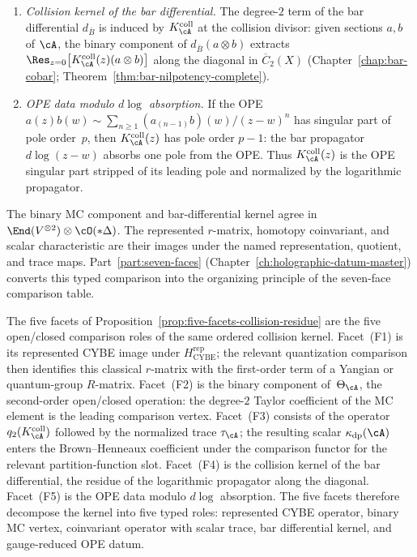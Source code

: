 \begin{proposition}
\begin{enumerate}[label=\textup{(F\arabic*)}]
\item \emph{Collision kernel of the bar differential.}
 The degree-$2$ term of the bar differential $d_{\bar{B}}$ is induced
 by $K_\cA^{\mathrm{coll}}$ at the collision divisor: given sections
 $a,b$ of $\cA$,
 the binary component of $d_{\bar{B}}(a \otimes b)$ extracts
 $\Res_{z=0}\bigl[K_\cA^{\mathrm{coll}}(z)(a \otimes b)\bigr]$ along the
 diagonal in $\overline{C}_2(X)$
 \textup{(}Chapter~\textup{\ref{chap:bar-cobar}};
 Theorem~\textup{\ref{thm:bar-nilpotency-complete}}\textup{)}.

\item \emph{OPE data modulo $d\log$ absorption.}
 If the OPE $a(z) b(w) \sim \sum_{n \geq 1}
 (a_{(n-1)} b)(w)/(z-w)^{n}$ has singular part of pole order~$p$,
 then $K_\cA^{\mathrm{coll}}(z)$ has pole order $p - 1$: the bar propagator
 $d\log(z - w)$ absorbs one pole from the OPE. Thus
 $K_\cA^{\mathrm{coll}}(z)$ is
 the OPE singular part stripped of its leading pole and normalized
 by the logarithmic propagator.
\end{enumerate}
The binary MC component and bar-differential kernel agree in
$\End(V^{\otimes 2})\otimes\cO(*\Delta)$.  The represented
$r$-matrix, homotopy coinvariant, and scalar characteristic are their
images under the named representation, quotient, and trace maps.
Part~\ref{part:seven-faces}
(Chapter~\textup{\ref{ch:holographic-datum-master}}) converts this
typed comparison into the organizing principle of the seven-face
comparison table.
\end{proposition}

\begin{remark}
\label{rem:five-facets-boundary-bulk}
%
%
The five facets of
Proposition~\ref{prop:five-facets-collision-residue} are the five
open/closed comparison roles of the same ordered collision kernel.
Facet~(F1) is its represented CYBE image under
$H_{\mathrm{CYBE}}^{\mathrm{rep}}$; the relevant quantization
comparison then identifies this classical $r$-matrix with the
first-order term of a Yangian or quantum-group $R$-matrix.
Facet~(F2) is the binary component of~$\Theta_\cA$, the
second-order open/closed operation: the degree-$2$ Taylor coefficient
of the MC element is the leading comparison vertex.
Facet~(F3) consists of the operator
$q_2(K_\cA^{\mathrm{coll}})$ followed by the normalized trace
$\tau_\cA$; the resulting scalar $\kappa_{\mathrm{dp}}(\cA)$ enters
the Brown--Henneaux coefficient under the comparison functor for the
relevant partition-function slot.
Facet~(F4) is the collision kernel of the bar differential, the
residue of the logarithmic propagator along the diagonal.
Facet~(F5) is the OPE data modulo $d\log$ absorption. The five facets
therefore decompose the kernel into five typed roles: represented
CYBE operator, binary MC vertex, coinvariant operator with scalar
trace, bar differential kernel, and gauge-reduced OPE datum.
\end{remark}


